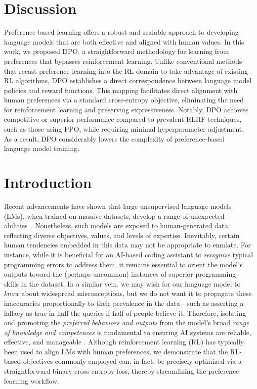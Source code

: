 \section{Discussion}
Preference-based learning offers a robust and scalable approach to developing language models that are both effective and aligned with human values. In this work, we proposed DPO, a straightforward methodology for learning from preferences that bypasses reinforcement learning. Unlike conventional methods that recast preference learning into the RL domain to take advantage of existing RL algorithms, DPO establishes a direct correspondence between language model policies and reward functions. This mapping facilitates direct alignment with human preferences via a standard cross-entropy objective, eliminating the need for reinforcement learning and preserving expressiveness. Notably, DPO achieves competitive or superior performance compared to prevalent RLHF techniques, such as those using PPO, while requiring minimal hyperparameter adjustment. As a result, DPO considerably lowers the complexity of preference-based language model training.

\section{Introduction}
Recent advancements have shown that large unsupervised language models (LMs), when trained on massive datasets, develop a range of unexpected abilities~\citep{chowdhery2022palm, brown2020language, touvron2023llama, bubeck2023sparks}. Nonetheless, such models are exposed to human-generated data reflecting diverse objectives, values, and levels of expertise. Inevitably, certain human tendencies embedded in this data may not be appropriate to emulate. For instance, while it is beneficial for an AI-based coding assistant to \textit{recognize} typical programming errors to address them, it remains essential to orient the model’s outputs toward the (perhaps uncommon) instances of superior programming skills in the dataset. In a similar vein, we may wish for our language model to \textit{know} about widespread misconceptions, but we do not want it to propagate these inaccuracies proportionally to their prevalence in the data—such as asserting a fallacy as true in half the queries if half of people believe it. Therefore, isolating and promoting the \emph{preferred behaviors and outputs} from the model’s broad \textit{range of knowledge and competences} is fundamental to ensuring AI systems are reliable, effective, and manageable \citep{ouyang2022training}. Although reinforcement learning (RL) has typically been used to align LMs with human preferences, we demonstrate that the RL-based objectives commonly employed can, in fact, be precisely optimized via a straightforward binary cross-entropy loss, thereby streamlining the preference learning workflow.

